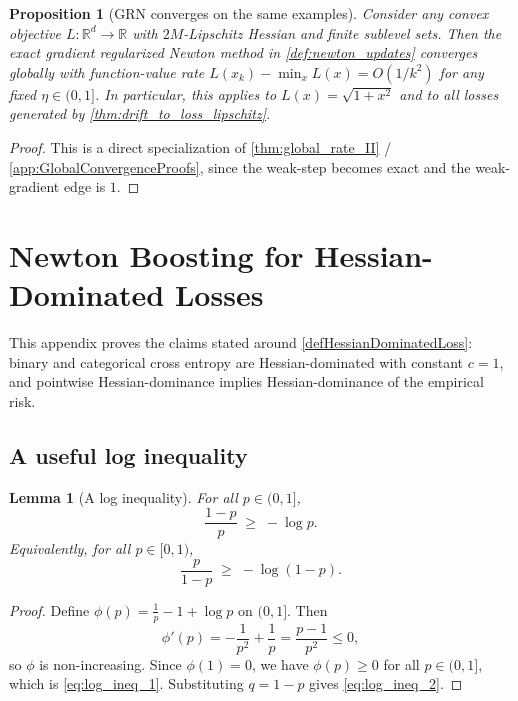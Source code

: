 \documentclass{article}
\theoremstyle{plain}
\newtheorem{proposition}[theorem]{Proposition}
\newtheorem{lemma}[theorem]{Lemma}
\theoremstyle{definition}
\theoremstyle{remark}
\begin{document}
\begin{proposition}[GRN converges on the same examples]
\label{prop:grn_converges}
Consider any convex objective $L:\mathbb{R}^d\to\mathbb{R}$ with $2M$-Lipschitz Hessian and finite sublevel sets. Then the exact gradient regularized Newton method in \cref{def:newton_updates}
converges globally with function-value rate $L(x_k)-\min_x L(x)=O(1/k^2)$ for any fixed $\eta\in(0,1]$.
In particular, this applies to $L(x)=\sqrt{1+x^2}$ and to all losses generated by
\cref{thm:drift_to_loss_lipschitz}.
\end{proposition}

\begin{proof}
This is a direct specialization of \cref{thm:global_rate_II} / \cref{app:GlobalConvergenceProofs},
since the weak-step becomes exact and the weak-gradient edge is $1$.
\end{proof}

\newpage

\section{Newton Boosting for Hessian-Dominated Losses}\label{app:HessianDominatedLoss}



This appendix proves the claims stated around \cref{defHessianDominatedLoss}: binary and
categorical cross entropy are Hessian-dominated with constant $c=1$, and
pointwise Hessian-dominance implies Hessian-dominance of the empirical risk.

\subsection{A useful log inequality}

\begin{lemma}[A log inequality]
\label{lem:log_ineq}
For all $p\in(0,1]$,
\begin{equation}
\label{eq:log_ineq_1}
\frac{1-p}{p} \;\ge\; -\log p.
\end{equation}
Equivalently, for all $p\in[0,1)$,
\begin{equation}
\label{eq:log_ineq_2}
\frac{p}{1-p} \;\ge\; -\log(1-p).
\end{equation}
\end{lemma}

\begin{proof}
Define $\phi(p)=\frac{1}{p}-1+\log p$ on $(0,1]$. Then
\[
\phi'(p)=-\frac{1}{p^2}+\frac{1}{p}=\frac{p-1}{p^2}\le 0,
\]
so $\phi$ is non-increasing. Since $\phi(1)=0$, we have $\phi(p)\ge 0$ for all
$p\in(0,1]$, which is \eqref{eq:log_ineq_1}. Substituting $q=1-p$ gives
\eqref{eq:log_ineq_2}.
\end{proof}
\end{document}
